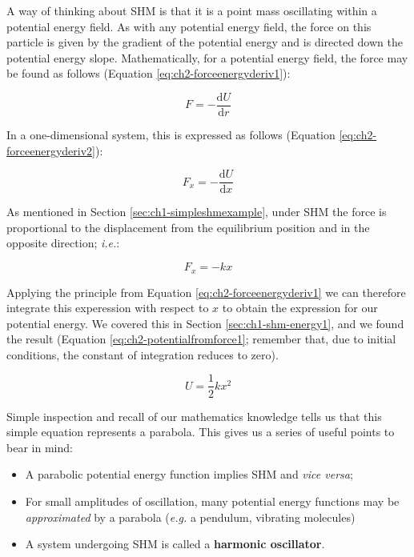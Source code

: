 \documentclass[
]{book}
\providecommand{\tightlist}{%
  \setlength{\itemsep}{0pt}\setlength{\parskip}{0pt}}
\begin{document}
A way of thinking about SHM is that it is a point mass oscillating within a potential energy field. As with any potential energy field, the force on this particle is given by the gradient of the potential energy and is directed down the potential energy slope. Mathematically, for a potential energy field, the force may be found as follows (Equation \eqref{eq:ch2-forceenergyderiv1}):

\begin{equation}
F = - \frac{\mathrm{d}U}{\mathrm{d}r}
\label{eq:ch2-forceenergyderiv1}
\end{equation}

In a one-dimensional system, this is expressed as follows (Equation \eqref{eq:ch2-forceenergyderiv2}):

\begin{equation}
F_x = - \frac{\mathrm{d}U}{\mathrm{d}x}
\label{eq:ch2-forceenergyderiv2}
\end{equation}

As mentioned in Section \ref{sec:ch1-simpleshmexample}, under SHM the force is proportional to the displacement from the equilibrium position and in the opposite direction; \emph{i.e.}:

\begin{equation}
F_x = -kx
\label{eq:ch2-hookeslaw1}
\end{equation}

Applying the principle from Equation \eqref{eq:ch2-forceenergyderiv1} we can therefore integrate this experession with respect to \(x\) to obtain the expression for our potential energy. We covered this in Section \ref{sec:ch1-shm-energy1}, and we found the result (Equation \eqref{eq:ch2-potentialfromforce1}; remember that, due to initial conditions, the constant of integration reduces to zero).

\begin{equation}
U  = \frac{1}{2}kx^2 
\label{eq:ch2-potentialfromforce1}
\end{equation}

Simple inspection and recall of our mathematics knowledge tells us that this simple equation represents a parabola. This gives us a series of useful points to bear in mind:

\begin{itemize}
\tightlist
\item
  A parabolic potential energy function implies SHM and \emph{vice versa};
\item
  For small amplitudes of oscillation, many potential energy functions may be \emph{approximated} by a parabola (\emph{e.g.} a pendulum, vibrating molecules)
\item
  A system undergoing SHM is called a \textbf{harmonic oscillator}.
\end{itemize}
\end{document}
